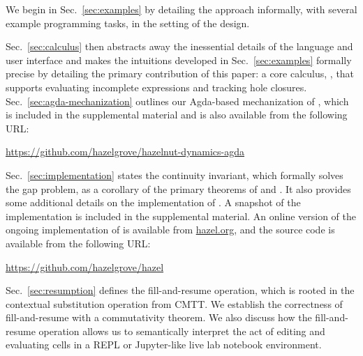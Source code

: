 \vspace{-2px}

\newcommand{\contribution}[2]{\paragraph{#1. #2}} 


We begin in Sec.~\ref{sec:examples} by detailing the approach informally, with several example programming tasks, in the setting of the \Hazel design. 

Sec.~\ref{sec:calculus} then abstracts away the inessential details of the language and user interface and makes the  intuitions developed in Sec.~\ref{sec:examples} formally precise by detailing the primary contribution of this paper: a core calculus, \HazelnutLive, that supports evaluating incomplete expressions and tracking hole closures. 
Sec.~\ref{sec:agda-mechanization} outlines our Agda-based mechanization of \HazelnutLive, which is included in the supplemental material and is also available from the following URL: 

\begin{center}
\url{https://github.com/hazelgrove/hazelnut-dynamics-agda}
\end{center}

\noindent
Sec.~\ref{sec:implementation} states the continuity invariant, which formally solves the gap problem, as a corollary of the primary theorems of \Hazelnut and \HazelnutLive. It also provides some additional details on the implementation of \Hazel. A snapshot of the implementation is included in the supplemental material. An online version of the ongoing implementation of \Hazel is available from \url{hazel.org}, and the source code is available from the following URL:

\begin{center}
\url{https://github.com/hazelgrove/hazel}
\end{center}

Sec.~\ref{sec:resumption} defines the fill-and-resume operation, which is rooted in the contextual substitution operation from CMTT. We establish the correctness of fill-and-resume with a commutativity theorem. We also discuss how the fill-and-resume operation allows us to semantically interpret the act of editing and evaluating cells in a REPL or Jupyter-like live lab notebook environment.

